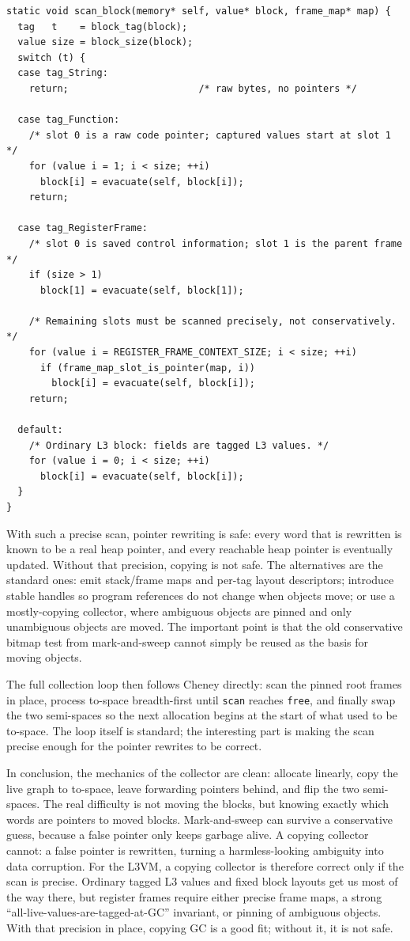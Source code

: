 \documentclass[11pt]{article}
\begin{document}
\begin{lstlisting}
static void scan_block(memory* self, value* block, frame_map* map) {
  tag   t    = block_tag(block);
  value size = block_size(block);
  switch (t) {
  case tag_String:
    return;                       /* raw bytes, no pointers */

  case tag_Function:
    /* slot 0 is a raw code pointer; captured values start at slot 1 */
    for (value i = 1; i < size; ++i)
      block[i] = evacuate(self, block[i]);
    return;

  case tag_RegisterFrame:
    /* slot 0 is saved control information; slot 1 is the parent frame */
    if (size > 1)
      block[1] = evacuate(self, block[1]);

    /* Remaining slots must be scanned precisely, not conservatively. */
    for (value i = REGISTER_FRAME_CONTEXT_SIZE; i < size; ++i)
      if (frame_map_slot_is_pointer(map, i))
        block[i] = evacuate(self, block[i]);
    return;

  default:
    /* Ordinary L3 block: fields are tagged L3 values. */
    for (value i = 0; i < size; ++i)
      block[i] = evacuate(self, block[i]);
  }
}
\end{lstlisting}

With such a precise scan, pointer rewriting is safe: every word that is rewritten is known to be a real heap pointer, and every reachable heap pointer is eventually updated. Without that precision, copying is not safe. The alternatives are the standard ones: emit stack/frame maps and per-tag layout descriptors; introduce stable handles so program references do not change when objects move; or use a mostly-copying collector, where ambiguous objects are pinned and only unambiguous objects are moved. The important point is that the old conservative bitmap test from mark-and-sweep cannot simply be reused as the basis for moving objects. 

The full collection loop then follows Cheney directly: scan the pinned root frames in place, process to-space breadth-first until \texttt{scan} reaches \texttt{free}, and finally swap the two semi-spaces so the next allocation begins at the start of what used to be to-space. The loop itself is standard; the interesting part is making the scan precise enough for the pointer rewrites to be correct. 

In conclusion, the mechanics of the collector are clean: allocate linearly, copy the live graph to to-space, leave forwarding pointers behind, and flip the two semi-spaces. The real difficulty is not moving the blocks, but knowing exactly which words are pointers to moved blocks. Mark-and-sweep can survive a conservative guess, because a false pointer only keeps garbage alive. A copying collector cannot: a false pointer is rewritten, turning a harmless-looking ambiguity into data corruption. For the L3VM, a copying collector is therefore correct only if the scan is precise. Ordinary tagged L3 values and fixed block layouts get us most of the way there, but register frames require either precise frame maps, a strong ``all-live-values-are-tagged-at-GC'' invariant, or pinning of ambiguous objects. With that precision in place, copying GC is a good fit; without it, it is not safe.
\end{document}
